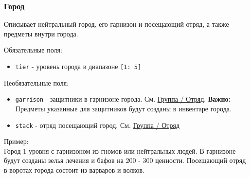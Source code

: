 \subsubsection{Город}
\label{city}
Описывает нейтральный город, его гарнизон и посещающий отряд, а также предметы внутри города.

Обязательные поля:
\begin{itemize}
\item \texttt{tier} - уровень города в диапазоне \texttt{[1: 5]}
\end{itemize}

Необязательные поля:
\begin{itemize}
\item \texttt{garrison} - защитники в гарнизоне города. См. \hyperref[group]{Группа / Отряд}. \textbf{Важно:} Предметы указанные для защитников будут созданы в инвентаре города.
\item \texttt{stack} - отряд посещающий город. См. \hyperref[group]{Группа / Отряд}
\end{itemize}

Пример:\\
Город 1 уровня с гарнизоном из гномов или нейтральных людей.
В гарнизоне будут созданы зелья лечения и бафов на 200 - 300 ценности.
Посещающий отряд в воротах города состоит из варваров и волков.

\begin{figure}[H]

\end{figure}